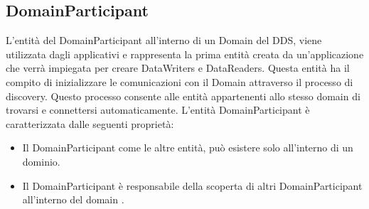 
\subsection{DomainParticipant}
L'entità del DomainParticipant all'interno di un Domain del DDS,
viene utilizzata dagli applicativi e 
rappresenta la prima entità creata da un'applicazione che verrà 
impiegata per creare DataWriters e DataReaders. 
Questa entità ha il compito di inizializzare
le comunicazioni con il Domain attraverso 
il processo di discovery.
Questo processo consente alle entità appartenenti allo 
stesso domain di trovarsi e connettersi automaticamente.
L'entità DomainParticipant è caratterizzata dalle seguenti proprietà:
\begin{itemize}
    \item Il DomainParticipant come le altre entità, può 
    esistere solo all'interno di un dominio.
    \item Il DomainParticipant è responsabile della scoperta di altri
    DomainParticipant all'interno del domain \cite{domainparticipantrti}.
\end{itemize}


